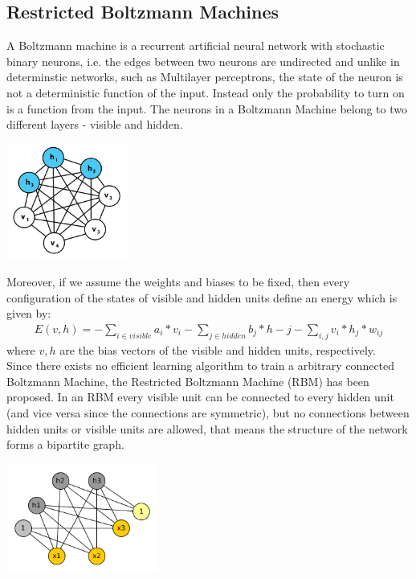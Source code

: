 \documentclass[a4paper]{scrartcl}
\begin{document}
\subsection{Restricted Boltzmann Machines}
A Boltzmann machine is a recurrent artificial neural network with stochastic binary neurons, i.e. the edges between two neurons are undirected and unlike in determinstic networks, such as Multilayer perceptrons, the state of the neuron is not a deterministic function of the input. Instead only the probability to turn on is a function from the input. The neurons in a Boltzmann Machine belong to two different layers - visible and hidden. 
\begin{center}
\includegraphics[width=4cm]{images/Boltzmannmachine.png}
\end{center}
Moreover, if we assume the weights and biases to be fixed, then every configuration of the states of visible and hidden units define an energy which is given by:
\begin{align}
E(v,h) = - \sum_{i \in visible} a_i*v_i - \sum_{j \in hidden} b_j*h-j - \sum_{i,j} v_i*h_j*w_{ij}
\end{align}
where $v, h$ are the bias vectors of the visible and hidden units, respectively. \\
Since there exists no efficient learning algorithm to train a arbitrary connected Boltzmann Machine, the Restricted Boltzmann Machine (RBM) has been proposed. In an RBM every visible unit can be connected to every hidden unit (and vice versa since the connections are symmetric), but no connections between hidden units or visible units are allowed, that means the structure of the network forms a bipartite graph.
\begin{center}
\includegraphics[width=5cm]{images/rbm2.png}
\end{center} 
\end{document}
